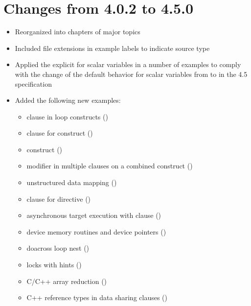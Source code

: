 \section{Changes from 4.0.2 to 4.5.0}
\begin{itemize}
\item Reorganized into chapters of major topics
\item Included file extensions in example labels to indicate source type
\item Applied the explicit  for scalar variables 
      in a number of examples to comply with 
      the change of the default behavior for scalar variables from 
       to  in the 4.5 specification
\item Added the following new examples:

\begin{itemize}
\item {} clause in loop constructs     ()
\item {} clause for  construct ()
\item {} construct                   ()
\item {} modifier in multiple  clauses on
a combined construct                              ()
\item unstructured data mapping                   ()
\item {} clause for  directive 
                                                  ()
\item asynchronous target execution with  clause ()
\item device memory routines and device pointers  ()
\item doacross loop nest                          ()
\item locks with hints                            ()
\item C/C++ array reduction                       ()
\item C++ reference types in data sharing clauses ()
\end{itemize}

\end{itemize}

